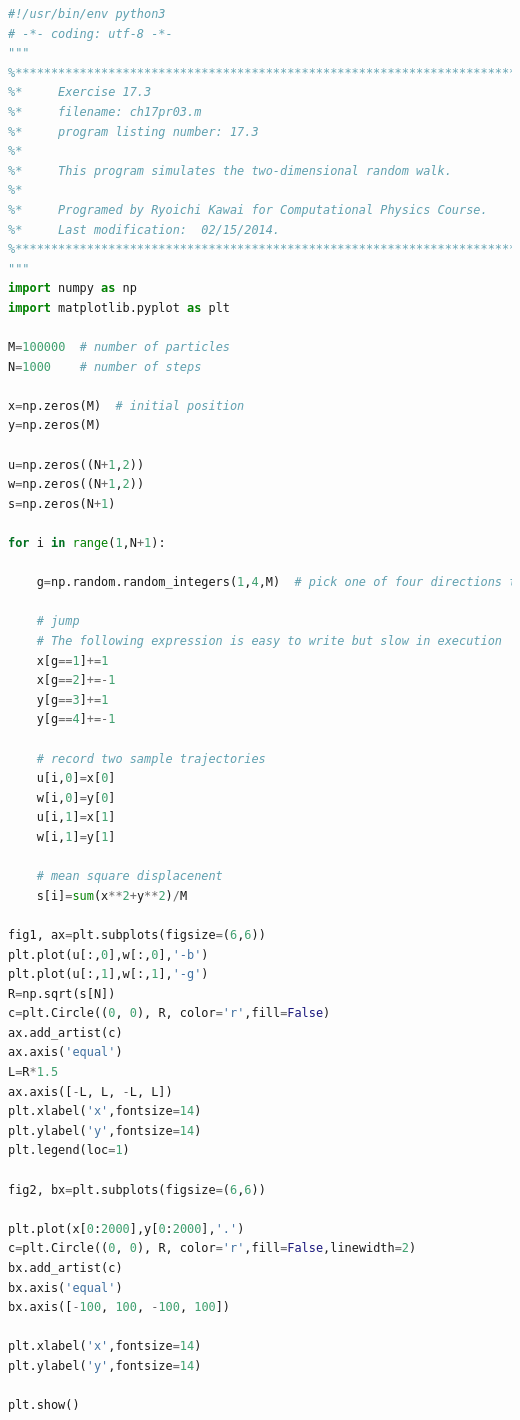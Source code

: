 \bigskip
\noindent
\program
\footnotesize
\begin{lstlisting}[language=python]
#!/usr/bin/env python3
# -*- coding: utf-8 -*-
"""
%**************************************************************************
%*     Exercise 17.3                                                      *
%*     filename: ch17pr03.m                                               *
%*     program listing number: 17.3                                       *
%*                                                                        *
%*     This program simulates the two-dimensional random walk.            *
%*                                                                        *
%*     Programed by Ryoichi Kawai for Computational Physics Course.       *
%*     Last modification:  02/15/2014.                                    *
%**************************************************************************
"""
import numpy as np
import matplotlib.pyplot as plt

M=100000  # number of particles
N=1000    # number of steps

x=np.zeros(M)  # initial position
y=np.zeros(M)

u=np.zeros((N+1,2))
w=np.zeros((N+1,2))
s=np.zeros(N+1)

for i in range(1,N+1):

    g=np.random.random_integers(1,4,M)  # pick one of four directions to jump
    
    # jump
    # The following expression is easy to write but slow in execution
    x[g==1]+=1
    x[g==2]+=-1
    y[g==3]+=1
    y[g==4]+=-1
    
    # record two sample trajectories
    u[i,0]=x[0]
    w[i,0]=y[0]
    u[i,1]=x[1]
    w[i,1]=y[1]

    # mean square displacenent
    s[i]=sum(x**2+y**2)/M

fig1, ax=plt.subplots(figsize=(6,6))
plt.plot(u[:,0],w[:,0],'-b')
plt.plot(u[:,1],w[:,1],'-g')
R=np.sqrt(s[N])
c=plt.Circle((0, 0), R, color='r',fill=False)
ax.add_artist(c)
ax.axis('equal')
L=R*1.5
ax.axis([-L, L, -L, L])
plt.xlabel('x',fontsize=14)
plt.ylabel('y',fontsize=14)
plt.legend(loc=1)

fig2, bx=plt.subplots(figsize=(6,6))

plt.plot(x[0:2000],y[0:2000],'.')
c=plt.Circle((0, 0), R, color='r',fill=False,linewidth=2)
bx.add_artist(c)
bx.axis('equal') 
bx.axis([-100, 100, -100, 100]) 

plt.xlabel('x',fontsize=14)
plt.ylabel('y',fontsize=14)

plt.show()
\end{lstlisting}
\normalsize

